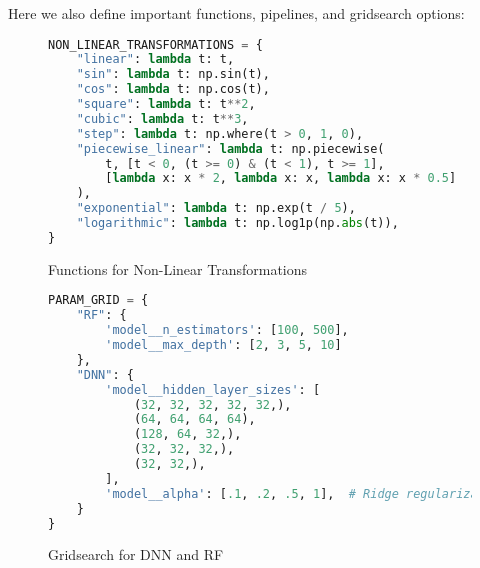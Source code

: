 \documentclass{article}
\numberwithin{equation}{section}
\begin{document}
Here we also define important functions, pipelines, and gridsearch options:

\begin{figure}[H]
\begin{lstlisting}[language=python]
NON_LINEAR_TRANSFORMATIONS = {
    "linear": lambda t: t,
    "sin": lambda t: np.sin(t),
    "cos": lambda t: np.cos(t),
    "square": lambda t: t**2,
    "cubic": lambda t: t**3,
    "step": lambda t: np.where(t > 0, 1, 0),
    "piecewise_linear": lambda t: np.piecewise(
        t, [t < 0, (t >= 0) & (t < 1), t >= 1],
        [lambda x: x * 2, lambda x: x, lambda x: x * 0.5]
    ),
    "exponential": lambda t: np.exp(t / 5),
    "logarithmic": lambda t: np.log1p(np.abs(t)),
}
\end{lstlisting}
\caption{Functions for Non-Linear Transformations}
\end{figure}

\begin{figure}[H]
\begin{lstlisting}[language=python]
PARAM_GRID = {
    "RF": {
        'model__n_estimators': [100, 500],
        'model__max_depth': [2, 3, 5, 10]
    },
    "DNN": {
        'model__hidden_layer_sizes': [
            (32, 32, 32, 32, 32,),
            (64, 64, 64, 64),
            (128, 64, 32,),
            (32, 32, 32,),
            (32, 32,),
        ],
        'model__alpha': [.1, .2, .5, 1],  # Ridge regularization
    }
}
\end{lstlisting}
\caption{Gridsearch for DNN and RF}
\end{figure}
\end{document}
